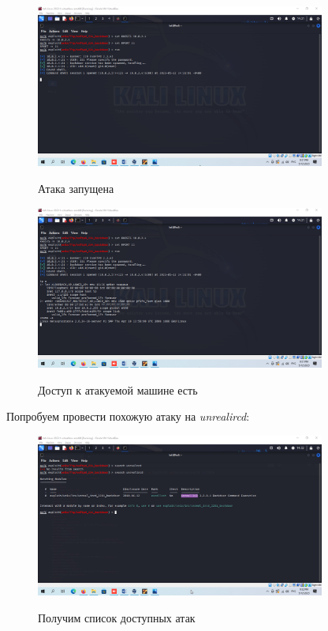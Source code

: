 \documentclass[a4paper]{article}
\begin{document}
  \begin{figure}[H]
    \centering
    \includegraphics[width=0.85\textwidth]{04_0068}
    \label{img:67}
    \caption{Атака запущена}
  \end{figure}

  \begin{figure}[H]
    \centering
    \includegraphics[width=0.85\textwidth]{04_0070}
    \label{img:69}
    \caption{Доступ к атакуемой машине есть}
  \end{figure}

  Попробуем провести похожую атаку на \textit{unrealircd}:

  \begin{figure}[H]
    \centering
    \includegraphics[width=0.85\textwidth]{04_0071}
    \label{img:70}
    \caption{Получим список доступных атак}
  \end{figure}
\end{document}
